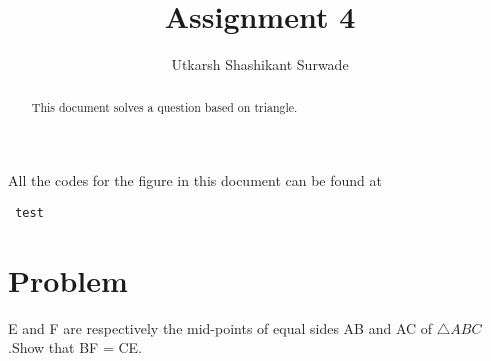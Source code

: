 \documentclass[journal,12pt,twocolumn]{IEEEtran}
\begin{document}
 \makeatletter
 \makeatother
 \let\StandardTheFigure\thefigure
 \let\vec\mathbf
 \renewcommand{\thefigure}{\theproblem}
 \def\putbox#1#2#3{\makebox[0in][l]{\makebox[#1][l]{}\raisebox{\baselineskip}[0in][0in]{\raisebox{#2}[0in][0in]{#3}}}}
      \def\rightbox#1{\makebox[0in][r]{#1}}
      \def\centbox#1{\makebox[0in]{#1}}
      \def\topbox#1{\raisebox{-\baselineskip}[0in][0in]{#1}}
      \def\midbox#1{\raisebox{-0.5\baselineskip}[0in][0in]{#1}}
 \vspace{3cm}
 \title{Assignment 4}
 \author{Utkarsh Shashikant Surwade}
 \maketitle
 \newpage
 \bigskip
 \renewcommand{\thefigure}{\theenumi}
 \renewcommand{\thetable}{\theenumi}
 \begin{abstract}
 This document solves a question based on triangle.
 \end{abstract}
 All the codes for the figure in this document can be found at
 \begin{lstlisting}
 test
 \end{lstlisting}
 \section{Problem}
 E and F are respectively the mid-points of equal sides AB and AC of $\triangle{ABC}$.Show that BF = CE.
\end{document}
